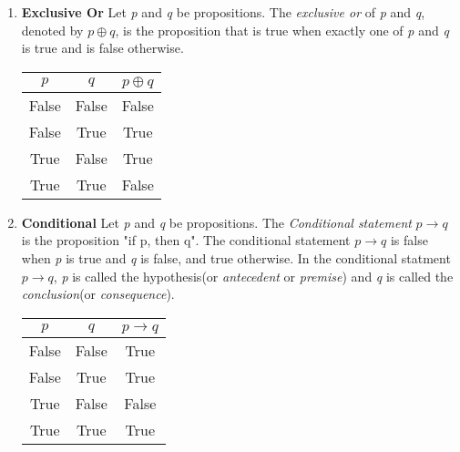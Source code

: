 \documentclass{book}
\begin{document}
\begin{enumerate}
\item \textbf{Exclusive Or}
Let \emph{p} and \emph{q} be propositions. The \emph{exclusive or} of \emph{p} and \emph{q}, denoted by $p \oplus q$, is the proposition that is true when exactly one of \emph{p} and \emph{q} is true and is false otherwise.

\begin{center}
\begin{tabular}{ |c|c|c|}
\hline
$p$ & $q$ & $p \oplus q$  \\ \hline
False & False & False \\
False & True & True \\
True & False & True \\
True & True & False \\ \hline
\end{tabular}
\end{center}

\item \textbf{Conditional}
Let \emph{p} and \emph{q} be propositions. The \emph{Conditional statement} $p \to q$ is the proposition "if p, then q". The conditional statement $p \to q$ is false when \emph{p} is true and \emph{q} is false, and true otherwise. In the conditional statment $p \to q$, \emph{p} is called the hypothesis(or \emph{antecedent} or \emph{premise}) and \emph{q} is called the \emph{conclusion}(or \emph{consequence}).

\begin{center}
\begin{tabular}{ |c|c|c|}
\hline
$p$ & $q$ & $p \to q$  \\ \hline
False & False & True \\
False & True & True \\
True & False & False \\
True & True & True \\ \hline
\end{tabular}
\end{center}


\end{enumerate}
\end{document}
